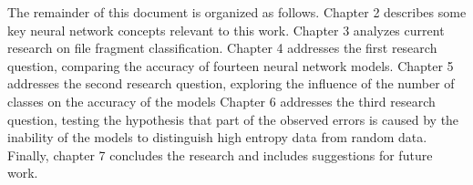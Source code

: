 
The remainder of this document is organized as follows.
Chapter 2 describes some key neural network concepts relevant to this work. 
Chapter 3 analyzes current research on file fragment classification.
Chapter 4 addresses the first research question, comparing the accuracy of fourteen neural network models.
Chapter 5 addresses the second research question, exploring the influence of the number of classes on the accuracy of the models
Chapter 6 addresses the third research question, testing the hypothesis that part of the observed errors is caused by the inability of the models to distinguish high entropy data from random data.    
Finally, chapter 7 concludes the research and includes suggestions for future work.
